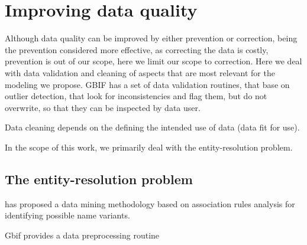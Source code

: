 \section{Improving data quality}
Although data quality can be improved by either prevention or correction, being the prevention considered more effective, as correcting the data is costly\cite{Chapman2005}, prevention is out of our scope, here we limit our scope to correction.
Here we deal with data validation and cleaning of aspects that are most relevant for the modeling we propose.
GBIF has a set of data validation routines, that base on outlier detection, that look for inconsistencies and flag them, but do not overwrite, so that they can be inspected by data user.

Data cleaning depends on the defining the intended use of data (data fit for use).

In the scope of this work, we primarily deal with the entity-resolution problem.

\subsection{The entity-resolution problem}
 has proposed a data mining methodology based on association rules analysis for identifying possible name variants.
\cite{Bhattacharya2007}

Gbif provides a data preprocessing routine %




















